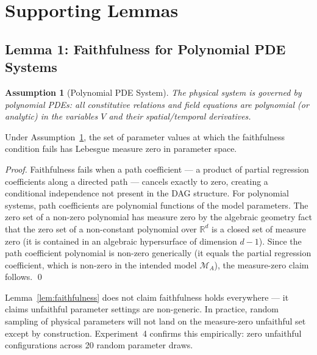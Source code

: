 \documentclass[twoside,11pt]{article}
\newtheorem{assumption}[theorem]{Assumption}
\begin{document}
\section{Supporting Lemmas}
\label{sec:lemmas}

\subsection{Lemma 1: Faithfulness for Polynomial PDE Systems}

\begin{assumption}[Polynomial PDE System]
\label{ass:poly}
The physical system is governed by polynomial PDEs: all constitutive
relations and field equations are polynomial (or analytic) in the
variables $V$ and their spatial/temporal derivatives.
\end{assumption}

\begin{lemma}
\label{lem:faithfulness}
Under Assumption~\ref{ass:poly}, the set of parameter values at which
the faithfulness condition fails has Lebesgue measure zero in parameter
space.
\end{lemma}

\begin{proof}
Faithfulness fails when a path coefficient --- a product of partial
regression coefficients along a directed path --- cancels exactly to
zero, creating a conditional independence not present in the DAG
structure. For polynomial systems, path coefficients are polynomial
functions of the model parameters. The zero set of a non-zero
polynomial has measure zero by the algebraic geometry fact that the
zero set of a non-constant polynomial over $\mathbb{R}^d$ is a closed
set of measure zero (it is contained in an algebraic hypersurface of
dimension $d-1$). Since the path coefficient polynomial is non-zero
generically (it equals the partial regression coefficient, which is
non-zero in the intended model $\mathcal{M}_A$), the measure-zero
claim follows. \qed
\end{proof}

\begin{remark}
Lemma~\ref{lem:faithfulness} does not claim faithfulness holds
everywhere --- it claims unfaithful parameter settings are
non-generic. In practice, random sampling of physical parameters
will not land on the measure-zero unfaithful set except by
construction. Experiment~4 confirms this empirically: zero unfaithful
configurations across 20 random parameter draws.
\end{remark}
\end{document}
